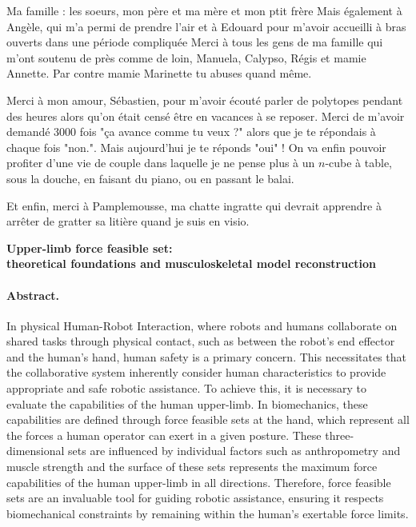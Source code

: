 Ma famille : les soeurs, mon père et ma mère et mon ptit frère
Mais également à Angèle, qui m'a permi de prendre l'air et à Edouard pour m'avoir accueilli à bras ouverts dans une période compliquée
Merci à tous les gens de ma famille qui m'ont soutenu de près comme de loin, Manuela, Calypso, Régis et mamie Annette.
Par contre mamie Marinette tu abuses quand même.

Merci à mon amour, Sébastien, pour m'avoir écouté parler de polytopes pendant des heures alors qu'on était censé être en vacances à se reposer. Merci de m'avoir demandé 3000 fois "ça avance comme tu veux ?" alors que je te répondais à chaque fois "non.". Mais aujourd'hui je te réponds "oui" ! On va enfin pouvoir profiter d'une vie de couple dans laquelle je ne pense plus à un $n$-cube à table, sous la douche, en faisant du piano, ou en passant le balai.

Et enfin, merci à Pamplemousse, ma chatte ingratte qui devrait apprendre à arrêter de gratter sa litière quand je suis en visio.

\clearpage
\begin{center}
    \textbf{Upper-limb force feasible set:}\\ 
    \textbf{theoretical foundations and musculoskeletal model reconstruction}
\end{center}
\paragraph*{Abstract.} 

In physical Human-Robot Interaction, where robots and humans collaborate on shared tasks through physical contact, such as between the robot's end effector and the human's hand, human safety is a primary concern. This necessitates that the collaborative system inherently consider human characteristics to provide appropriate and safe robotic assistance. To achieve this, it is necessary to evaluate the capabilities of the human upper-limb. In biomechanics, these capabilities are defined through force feasible sets at the hand, which represent all the forces a human operator can exert in a given posture. These three-dimensional sets are influenced by individual factors such as anthropometry and muscle strength and the surface of these sets represents the maximum force capabilities of the human upper-limb in all directions. Therefore, force feasible sets are an invaluable tool for guiding robotic assistance, ensuring it respects biomechanical constraints by remaining within the human's exertable force limits.

